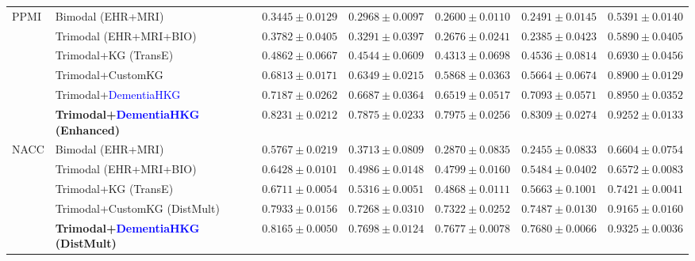 \documentclass[lettersize,journal]{IEEEtran}
\begin{document}
\begin{table}[t]
\begin{tabular}{llccccc}
        \multirow{6}{*}{PPMI}
            & Bimodal (EHR+MRI) & $0.3445 \pm 0.0129$ & $0.2968 \pm 0.0097$ & $0.2600 \pm 0.0110$ & $0.2491 \pm 0.0145$ & $0.5391 \pm 0.0140$ \\
            & Trimodal (EHR+MRI+BIO) & $0.3782 \pm 0.0405$ & $0.3291 \pm 0.0397$ & $0.2676 \pm 0.0241$ & $0.2385 \pm 0.0423$ & $0.5890 \pm 0.0405$ \\
            & Trimodal+KG (TransE) & $0.4862 \pm 0.0667$ & $0.4544 \pm 0.0609$ & $0.4313 \pm 0.0698$ & $0.4536 \pm 0.0814$ & $0.6930 \pm 0.0456$ \\
            & Trimodal+CustomKG & $0.6813 \pm 0.0171$ & $0.6349 \pm 0.0215$ & $0.5868 \pm 0.0363$ & $0.5664 \pm 0.0674$ & $0.8900 \pm 0.0129$ \\
            & Trimodal+\textcolor{blue}{DementiaHKG} & $0.7187 \pm 0.0262$ & $0.6687 \pm 0.0364$ & $0.6519 \pm 0.0517$ & $0.7093 \pm 0.0571$ & $0.8950 \pm 0.0352$ \\
            & \textbf{Trimodal+\textcolor{blue}{DementiaHKG} (Enhanced)} & $\mathbf{0.8231 \pm 0.0212}$ & $\mathbf{0.7875 \pm 0.0233}$ & $\mathbf{0.7975 \pm 0.0256}$ & $\mathbf{0.8309 \pm 0.0274}$ & $\mathbf{0.9252 \pm 0.0133}$ \\
        \midrule
        \multirow{5}{*}{NACC}
            & Bimodal (EHR+MRI) & $0.5767 \pm 0.0219$ & $0.3713 \pm 0.0809$ & $0.2870 \pm 0.0835$ & $0.2455 \pm 0.0833$ & $0.6604 \pm 0.0754$ \\
            & Trimodal (EHR+MRI+BIO) & $0.6428 \pm 0.0101$ & $0.4986 \pm 0.0148$ & $0.4799 \pm 0.0160$ & $0.5484 \pm 0.0402$ & $0.6572 \pm 0.0083$ \\
            & Trimodal+KG (TransE) & $0.6711 \pm 0.0054$ & $0.5316 \pm 0.0051$ & $0.4868 \pm 0.0111$ & $0.5663 \pm 0.1001$ & $0.7421 \pm 0.0041$ \\
            & Trimodal+CustomKG (DistMult) & $0.7933 \pm 0.0156$ & $0.7268 \pm 0.0310$ & $0.7322 \pm 0.0252$ & $0.7487 \pm 0.0130$ & $0.9165 \pm 0.0160$ \\
            & \textbf{Trimodal+\textcolor{blue}{DementiaHKG} (DistMult)} & $\mathbf{0.8165 \pm 0.0050}$ & $\mathbf{0.7698 \pm 0.0124}$ & $\mathbf{0.7677 \pm 0.0078}$ & $\mathbf{0.7680 \pm 0.0066}$ & $\mathbf{0.9325 \pm 0.0036}$ \\
        \bottomrule
    \end{tabular}
\end{table}
\end{document}
